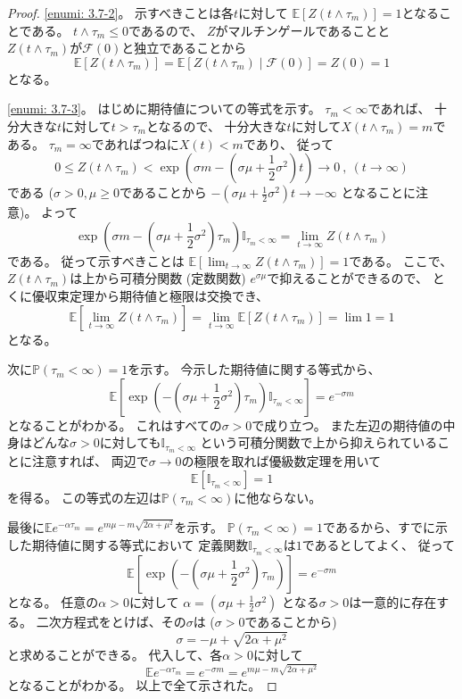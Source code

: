 \documentclass[uplatex]{jsarticle}
\theoremstyle{definition}
\def\P{\mathbb{P}}
\def\E{\mathbb{E}}
\def\I{\mathbb{I}}
\def\mcF{\mathcal{F}}
\begin{document}
\begin{proof}
  \ref{enumi: 3.7-2}。
  示すべきことは各\(t\)に対して
  \(\E[Z(t\wedge \tau_m)] = 1\)となることである。
  \(t\wedge\tau_m \leq 0\)であるので、
  \(Z\)がマルチンゲールであることと
  \(Z(t\wedge\tau_m)\)が\(\mcF(0)\)と独立であることから
  \[
  \E[Z(t\wedge \tau_m)] = \E[Z(t\wedge\tau_m)\mid \mcF(0)] = Z(0) = 1
  \]
  となる。

  \ref{enumi: 3.7-3}。
  はじめに期待値についての等式を示す。
  \(\tau_m < \infty\)であれば、
  十分大きな\(t\)に対して\(t > \tau_m\)となるので、
  十分大きな\(t\)に対して\(X(t\wedge\tau_m) = m\)である。
  \(\tau_m = \infty\)であればつねに\(X(t) < m\)であり、
  従って
  \[
  0 \leq Z(t\wedge \tau_m) < \exp \left(
  \sigma m - \left( \sigma\mu + \frac{1}{2}\sigma^2\right) t\right)
  \to 0 \ , \ (t\to \infty)
  \]
  である
  (\(\sigma > 0, \mu \geq 0\)であることから
  \(- \left( \sigma\mu + \frac{1}{2}\sigma^2\right) t \to -\infty\)
  となることに注意)。
  よって
  \[
  \exp\left(
  \sigma m - \left( \sigma\mu + \frac{1}{2}\sigma^2\right)\tau_m
  \right) \I_{\tau_m < \infty}
  = \lim_{t\to \infty} Z(t\wedge \tau_m)
  \]
  である。
  従って示すべきことは
  \(\E\left[ \lim_{t\to \infty} Z(t\wedge \tau_m)\right] = 1\)である。
  ここで、\(Z(t\wedge \tau_m)\)は上から可積分関数 (定数関数)
  \(e^{\sigma\mu}\)で抑えることができるので、
  とくに優収束定理から期待値と極限は交換でき、
  \[
  \E\left[ \lim_{t\to \infty} Z(t\wedge \tau_m)\right]
  = \lim_{t\to \infty} \E\left[ Z(t\wedge \tau_m)\right] = \lim 1 = 1
  \]
  となる。

  次に\(\P(\tau_m<\infty) = 1\)を示す。
  今示した期待値に関する等式から、
  \[
  \E \left[ \exp \left( - \left( \sigma\mu + \frac{1}{2}\sigma^2\right)\tau_m
  \right) \I_{\tau_m < \infty}\right] = e^{-\sigma m}
  \]
  となることがわかる。
  これはすべての\(\sigma > 0\)で成り立つ。
  また左辺の期待値の中身はどんな\(\sigma > 0\)に対しても\(\I_{\tau_m < \infty}\)
  という可積分関数で上から抑えられていることに注意すれば、
  両辺で\(\sigma \to 0\)の極限を取れば優級数定理を用いて
  \[
  \E \left[ \I_{\tau_m < \infty}\right] = 1
  \]
  を得る。
  この等式の左辺は\(\P(\tau_m < \infty)\)に他ならない。

  最後に\(\E e^{-\alpha\tau_m} = e^{m\mu - m\sqrt{2\alpha+\mu^2}}\)を示す。
  \(\P(\tau_m<\infty)=1\)であるから、すでに示した期待値に関する等式において
  定義関数\(\I_{\tau_m<\infty}\)は\(1\)であるとしてよく、
  従って
  \[
  \E \left[ \exp \left(
  - \left( \sigma\mu + \frac{1}{2}\sigma^2
  \right)\tau_m\right) \right] = e^{-\sigma m}
  \]
  となる。
  任意の\(\alpha > 0\)に対して
  \(\alpha = \left( \sigma\mu + \frac{1}{2}\sigma^2\right)\)
  となる\(\sigma > 0\)は一意的に存在する。
  二次方程式をとけば、その\(\sigma\)は (\(\sigma > 0\)であることから)
  \[
  \sigma = - \mu + \sqrt{2\alpha + \mu^2}
  \]
  と求めることができる。
  代入して、各\(\alpha > 0\)に対して
  \[
  \E e^{-\alpha\tau_m} = e^{-\sigma m} = e^{m\mu - m\sqrt{2\alpha + \mu^2}}
  \]
  となることがわかる。
  以上で全て示された。


\end{proof}
\end{document}
